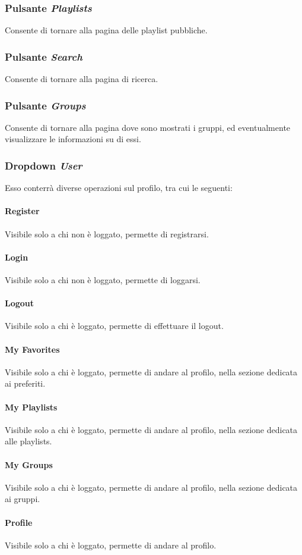 \subsubsection{Pulsante \textit{Playlists}}
Consente di tornare alla pagina delle playlist pubbliche.
\subsubsection{Pulsante \textit{Search}}
Consente di tornare alla pagina di ricerca.
\subsubsection{Pulsante \textit{Groups}}
Consente di tornare alla pagina dove sono mostrati i gruppi, ed eventualmente visualizzare le informazioni su di essi.
\subsubsection{Dropdown \textit{User}}
Esso conterrà diverse operazioni sul profilo, tra cui le seguenti:
\paragraph{Register}Visibile solo a chi non è loggato, permette di registrarsi.
\paragraph{Login}Visibile solo a chi non è loggato, permette di loggarsi.
\paragraph{Logout}Visibile solo a chi è loggato, permette di effettuare il logout.
\paragraph{My Favorites}Visibile solo a chi è loggato, permette di andare al profilo, nella sezione dedicata ai preferiti.
\paragraph{My Playlists}Visibile solo a chi è loggato, permette di andare al profilo, nella sezione dedicata alle playlists.
\paragraph{My Groups}Visibile solo a chi è loggato, permette di andare al profilo, nella sezione dedicata ai gruppi.
\paragraph{Profile}Visibile solo a chi è loggato, permette di andare al profilo.
\newpage